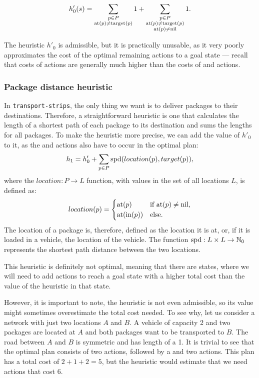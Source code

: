 $$h'_{0}(s) = \sum_{\substack{
p \in P\\ \textrm{at}(p) \neq \textrm{target}(p)}} 1
+ \sum_{\substack{
p \in P\\ \textrm{at}(p) \neq \textrm{target}(p)\\
\textrm{at}(p) \neq \textrm{nil}}} 1.$$

The heuristic $h'_0$ is admissible, but it is practically unusable, as it
very poorly approximates
the cost of the optimal remaining actions to a goal state
--- recall that costs of \drive{} actions are generally much higher than the costs of \pickup{} and \drop{} actions.

\subsubsection{Package distance heuristic}\label{sfa1}

In \texttt{transport-strips}, the only thing we want is to deliver packages to their destinations. Therefore, a straightforward heuristic is one that calculates the length of a shortest
path of each package to its destination and sums the lengths for all packages.
To make the heuristic more precise, we can add the
value of $h'_0$ to it, as the \pickup{} and \drop{}
actions also have to occur in the optimal plan:
$$h_1 = h'_0 + \sum_{p \in P} \textrm{spd}(location(p), target(p)),$$
where the $location: P \to L$ function,
with values in the set of all locations $L$, is defined as:
$$location(p) = \begin{cases}
   \textrm{at}(p) & \text{if } \textrm{at}(p) \neq \textrm{nil},\\
   \textrm{at}(\textrm{in}(p)) & \text{else}.
  \end{cases}$$
The location of a package is, therefore, defined
as the location it is at, or, if it is loaded in a vehicle,
the location of the vehicle.
The function $\textrm{spd}: L \times L \to \mathbb{N}_0$ represents
the shortest path distance between the two locations.

This heuristic is definitely not optimal, meaning that there are states,
where we will need to add actions to reach a goal state with a higher total cost than the value of the heuristic in that state.

However, it is important to note, the heuristic
is not even admissible, so its value might sometimes overestimate the total cost needed.
To see why, let us consider a network with just two locations $A$ and $B$.
A vehicle of capacity 2 and two packages are located at $A$ and both packages want to be
transported to $B$. The road between $A$ and $B$ is symmetric and has length
of a 1. It is trivial to see that the optimal plan consists of two \pickup{} actions,
followed by a \drive{} and two \drop{} actions. This plan has a total cost of $2+1+2=5$,
but the heuristic would estimate that we need actions
that cost $6$.

